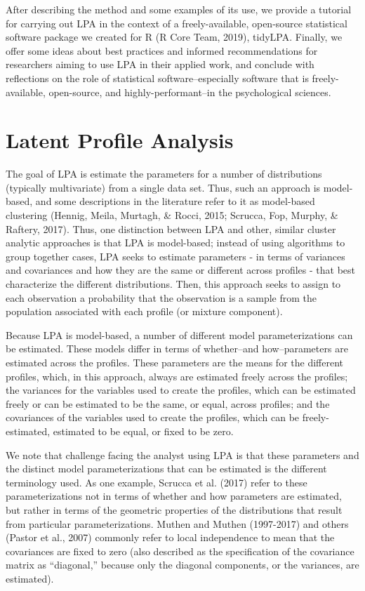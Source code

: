 \documentclass[man]{apa6}
\begin{document}
After describing the method and some examples of its use, we provide a tutorial
for carrying out LPA in the context of a freely-available, open-source
statistical software package we created for R (R Core Team, 2019), tidyLPA.
Finally, we offer some ideas about best practices and informed recommendations
for researchers aiming to use LPA in their applied work, and conclude with
reflections on the role of statistical software--especially software that is
freely-available, open-source, and highly-performant--in the psychological
sciences.

\hypertarget{latent-profile-analysis}{%
\section{Latent Profile Analysis}\label{latent-profile-analysis}}

The goal of LPA is estimate the parameters for a number of distributions
(typically multivariate) from a single data set. Thus, such an approach is
model-based, and some descriptions in the literature refer to it as model-based
clustering (Hennig, Meila, Murtagh, \& Rocci, 2015; Scrucca, Fop, Murphy, \&
Raftery, 2017). Thus, one distinction between LPA and other, similar cluster
analytic approaches is that LPA is model-based; instead of using algorithms to
group together cases, LPA seeks to estimate parameters - in terms of variances
and covariances and how they are the same or different across profiles - that
best characterize the different distributions. Then, this approach seeks to
assign to each observation a probability that the observation is a sample from
the population associated with each profile (or mixture component).

Because LPA is model-based, a number of different model parameterizations can be
estimated. These models differ in terms of whether--and how--parameters are
estimated across the profiles. These parameters are the means for the different
profiles, which, in this approach, always are estimated freely across the
profiles; the variances for the variables used to create the profiles, which can
be estimated freely or can be estimated to be the same, or equal, across
profiles; and the covariances of the variables used to create the profiles,
which can be freely-estimated, estimated to be equal, or fixed to be zero.

We note that challenge facing the analyst using LPA is that these
parameters and the distinct model parameterizations that can be estimated is the
different terminology used. As one example, Scrucca et al. (2017) refer to these
parameterizations not in terms of whether and how parameters are estimated, but
rather in terms of the geometric properties of the distributions that result
from particular parameterizations. Muthen and Muthen (1997-2017) and others
(Pastor et al., 2007) commonly refer to local independence to mean that the
covariances are fixed to zero (also described as the specification of the
covariance matrix as \enquote{diagonal,} because only the diagonal components, or the
variances, are estimated).
\end{document}

